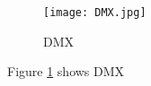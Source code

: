 \documentclass{article}
\begin{document}
	\begin{figure}
		\texttt{[image: DMX.jpg]}
		\caption{DMX}
		\label{fig:P1}
	\end{figure}
	Figure \ref{fig:P1} shows DMX
\end{document}
